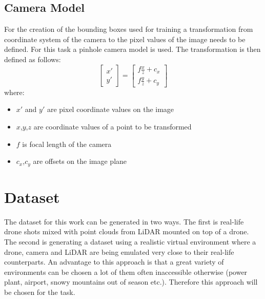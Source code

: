 \documentclass[twoside]{ctuthesis}
\theoremstyle{plain}
\theoremstyle{definition}
\theoremstyle{note}
\begin{document}
\section{Camera Model}
For the creation of the bounding boxes used for training a transformation from coordinate system of the camera to the pixel values of the image needs to be defined. For this task a pinhole camera model is used.
The transformation is then defined as follows:
\begin{equation}
	\begin{bmatrix}
		x'\\
		y'
	\end{bmatrix}=
	\begin{bmatrix}
		f\frac{x}{z}+c_x\\
		f\frac{y}{z}+c_y
	\end{bmatrix}
\end{equation}
where:
\begin{itemize}
	\item $x'$ and $y'$ are pixel coordinate values on the image
	\item $x$,$y$,$z$ are coordinate values of a point to be transformed
	\item $f$ is focal length of the camera
	\item $c_x$,$c_y$ are offsets on the image plane
\end{itemize}
\chapter{Dataset}
The dataset for this work can be generated in two ways. The first is real-life drone shots mixed with point clouds from LiDAR mounted on top of a drone. The second is generating a dataset using a realistic virtual environment where a drone, camera and LiDAR are being emulated very close to their real-life counterparts. An advantage to this approach is that a great variety of environments can be chosen a lot of them often inaccessible otherwise (power plant, airport, snowy mountains out of season etc.). Therefore this approach will be chosen for the task.
\end{document}
